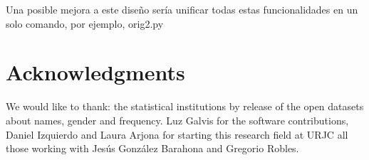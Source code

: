 \documentclass[a4paper]{article}
\begin{document}
Una posible mejora a este diseño sería unificar todas estas funcionalidades
en un solo comando, por ejemplo, orig2.py


\section*{Acknowledgments}

We would like to thank: the statistical institutions by
release of the open datasets about names, gender and frequency.
Luz Galvis for the software contributions, Daniel Izquierdo and
Laura Arjona for starting this research field at URJC all those
working with Jesús González Barahona and Gregorio Robles. 



\end{document}
